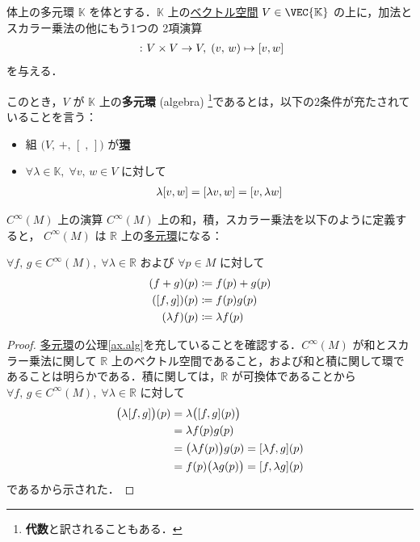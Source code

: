 \documentclass[geometry_main]{subfiles}
\begin{document}
\begin{myaxiom}[label=ax.alg]{体上の多元環}
	$\mathbb{K}$ を体とする．$\mathbb{K}$ 上の\hyperref[ax.vector]{ベクトル空間} $V \in \VEC{\mathbb{K}}$ の上に，加法とスカラー乗法の他にもう1つの
	2項演算
	\begin{align}
		[\;,\,]\; \colon V \times V \to V,\; (v,\, w) \mapsto \comm{v}{w}
	\end{align}
	を与える．
	
	このとき，$V$ が $\mathbb{K}$ 上の\textbf{多元環} (algebra) \footnote{\textbf{代数}と訳されることもある．}であるとは，以下の2条件が充たされていることを言う：
	\begin{itemize}
		\item 組 $\bigl(V,\, +,\, [\;,\,]\bigr)$ が\hyperref[ax:ring]{\textbf{環}}
		\item $\forall \lambda \in \mathbb{K},\; \forall v,\, w \in V$ に対して
		\begin{align}
			\lambda \comm{v}{w} = \comm{\lambda v}{w} = \comm{v}{\lambda w}
		\end{align}
	\end{itemize}
\end{myaxiom}

\begin{mydef}[label=op_cinfty]{$C^\infty (M)$ 上の演算}
	\hyperref[def.cinfty]{$C^\infty (M)$} 上の和，積，スカラー乗法を以下のように定義すると，
	$C^\infty(M)$ は $\mathbb{R}$ 上の\hyperref[ax.alg]{多元環}になる：

	$\forall f,\, g \in C^\infty (M),\; \forall \lambda \in \mathbb{R}$ および $\forall p \in M$ に対して
	\begin{align}
		(f + g)(p) &\coloneqq f(p) + g(p) \\
		(\comm{f}{g})(p) &\coloneqq f(p) g(p) \\
		(\lambda f)(p) &\coloneqq \lambda f(p)
	\end{align}
\end{mydef}

\begin{proof}
	\hyperref[ax.alg]{多元環}の公理\ref{ax.alg}を充していることを確認する．$C^\infty (M)$ が和とスカラー乗法に関して $\mathbb{R}$ 上のベクトル空間であること，および和と積に関して環であることは明らかである．積に関しては，$\mathbb{R}$ が可換体であることから $\forall f,\, g \in C^\infty(M),\; \forall \lambda \in \mathbb{R}$ に対して
	\begin{align}
		\bigl(\lambda \comm{f}{g} \bigr)(p) &= \lambda \bigl(\comm{f}{g}(p)\bigr) \\
		&= \lambda f(p) g(p)   \\
		&= \bigl( \lambda f(p)  \bigr) g(p) = \comm{\lambda f}{g}(p) \\
		&= f(p) \bigl( \lambda g(p) \bigr)  = \comm{f}{\lambda g}(p) \\
	\end{align}
	であるから示された．
\end{proof}
\end{document}
